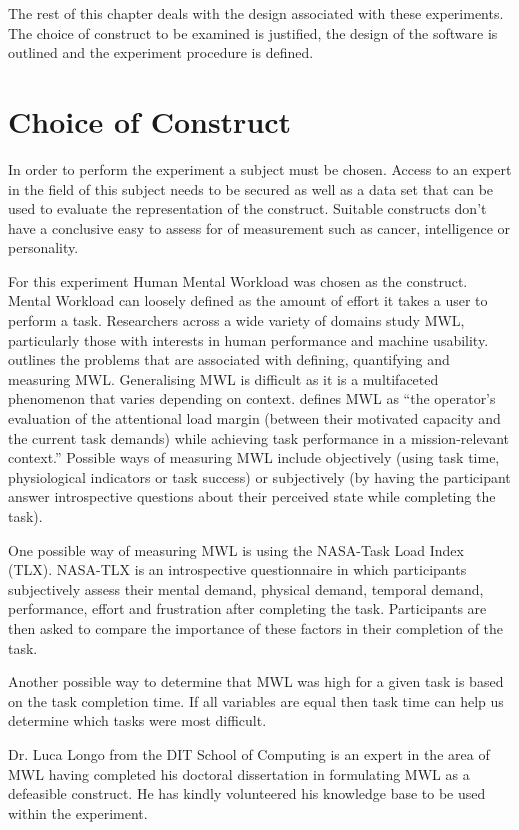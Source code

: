 The rest of this chapter deals with the design associated with these experiments. The choice of construct to be examined is justified, the design of the software is outlined and the experiment procedure is defined.

\section{Choice of Construct}
\label{sec:choicofc}

In order to perform the experiment a subject must be chosen. Access to an expert in the field of this subject needs to be secured as well as a data set that can be used to evaluate the representation of the construct. Suitable constructs don't have a conclusive easy to assess for of measurement such as  cancer, intelligence or personality. 

For this experiment Human Mental Workload was chosen as the construct. Mental Workload can loosely defined as the amount of effort it takes a user to perform a task. Researchers across a wide variety of domains study MWL, particularly those with interests in human performance and machine usability. \cite{meshkati2011human} outlines the problems that are associated with defining, quantifying and measuring MWL. Generalising MWL is difficult as it is a multifaceted phenomenon that varies depending on context. \cite{meshkati2011human} defines MWL as ``the operator's evaluation of the attentional load margin (between their motivated capacity and the current task demands) while achieving task performance in a mission-relevant context.'' Possible ways of measuring MWL include objectively (using task time, physiological indicators or task success) or subjectively (by having the participant answer introspective questions about their perceived state while completing the task).

One possible way of measuring MWL is using the NASA-Task Load Index (TLX). NASA-TLX is an introspective questionnaire in which participants subjectively assess their mental demand, physical demand, temporal demand, performance, effort and frustration after completing the task. Participants are then asked to compare the importance of these factors in their completion of the task. 

Another possible way to determine that MWL was high for a given task is based on the task completion time. If all variables are equal then task time can help us determine which tasks were most difficult.

Dr. Luca Longo from the DIT School of Computing is an expert in the area of MWL having completed his doctoral dissertation in formulating MWL as a defeasible construct. He has kindly volunteered his knowledge base to be used within the experiment.

